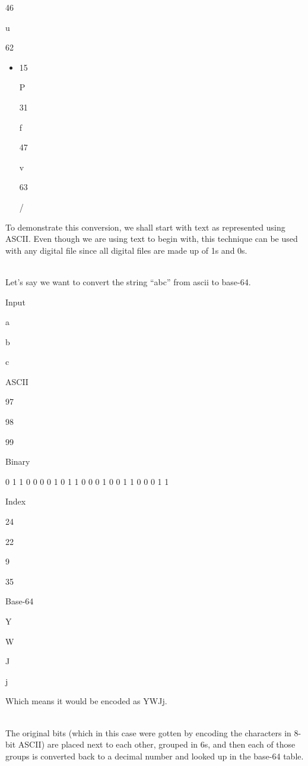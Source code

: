 \documentclass[
  letterpaper,
  DIV=11,
  numbers=noendperiod]{scrartcl}
\newenvironment{Shaded}{\begin{snugshade}}{\end{snugshade}}
\newcommand{\NormalTok}[1]{\textcolor[rgb]{0.00,0.23,0.31}{#1}}
\begin{document}
46

u

62

\begin{itemize}
\item
  15

  P

  31

  f

  47

  v

  63

  /
\end{itemize}

To demonstrate this conversion, we shall start with text as represented
using ASCII. Even though we are using text to begin with, this technique
can be used with any digital file since all digital files are made up of
1s and 0s.\\
\strut \\
Let's say we want to convert the string ``abc'' from ascii to base-64.

Input

a

b

c

ASCII

97

98

99

Binary

0 1 1 0 0 0 0 1 0 1 1 0 0 0 1 0 0 1 1 0 0 0 1 1

Index

24

22

9

35

Base-64

Y

W

{J}

j

\hfill\break
Which means it would be encoded as YWJj.\\
\strut \\
The original bits (which in this case were gotten by encoding the
characters in 8-bit ASCII) are placed next to each other, grouped in 6s,
and then each of those groups is converted back to a decimal number and
looked up in the base-64 table.

\begin{Shaded}
\end{Shaded}
\end{document}
